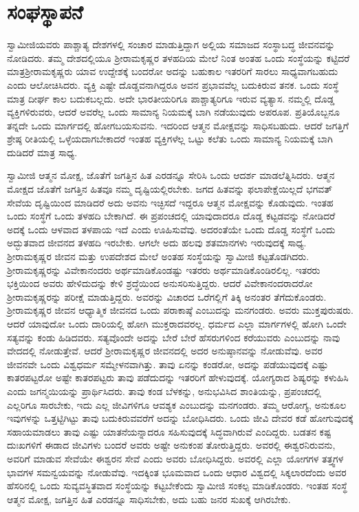 
\chapter{ಸಂಘಸ್ಥಾಪನೆ}

 ಸ್ವಾಮೀಜಿಯವರು ಪಾಶ್ಚಾತ್ಯ ದೇಶಗಳಲ್ಲಿ ಸಂಚಾರ ಮಾಡುತ್ತಿದ್ದಾಗ ಅಲ್ಲಿಯ ಸಮಾಜದ ಸಂಸ್ಥಾಬದ್ಧ ಜೀವನವನ್ನು ನೋಡಿದರು. ತಮ್ಮ ದೇಶದಲ್ಲಿಯೂ ಶ‍್ರೀರಾಮಕೃಷ್ಣರ ತಳಹದಿಯ ಮೇಲೆ ನಿಂತ ಅಂತಹ ಒಂದು ಸಂಸ್ಥೆಯನ್ನು ಕಟ್ಟಿದರೆ ಮಾತ್ರ\break ಶ‍್ರೀರಾಮಕೃಷ್ಣರು ಯಾವ ಉದ್ದೇಶಕ್ಕೆ ಬಂದರೋ ಅದನ್ನು ಬಹುಕಾಲ ಇತರರಿಗೆ ಸಾರಲು ಸಾಧ್ಯವಾಗಬಹುದು ಎಂದು ಆಲೋಚಿಸಿದರು. ವ್ಯಕ್ತಿ ಎಷ್ಟೇ ದೊಡ್ಡವನಾಗಿದ್ದರೂ ಅವನ ಪ್ರಭಾವವೆಲ್ಲ ಬದುಕಿರುವ ತನಕ. ಒಂದು ಸಂಸ್ಥೆ ಮಾತ್ರ ದೀರ್ಘ ಕಾಲ ಬದುಕಬಲ್ಲದು. ಅದೇ ಭಾರತೀಯರಿಗೂ‌ ಪಾಶ್ಚಾತ್ಯರಿಗೂ ಇರುವ ವ್ಯತ್ಯಾಸ. ನಮ್ಮಲ್ಲಿ ದೊಡ್ಡ ವ್ಯಕ್ತಿಗಳಿರುವರು, ಆದರೆ ಅವರೆಲ್ಲ ಒಂದು ಸಾಮಾನ್ಯ ನಿಯಮಕ್ಕೆ ಬಾಗಿ ನಡೆಯುವುದು ಅಪರೂಪ. ಪ್ರತಿಯೊಬ್ಬನೂ ತನ್ನದೇ ಒಂದು ಮಾರ್ಗದಲ್ಲಿ ಹೋಗಬಯಸುವನು. ಇದರಿಂದ ಆತ್ಮನ ಮೋಕ್ಷವನ್ನು ಸಾಧಿಸಬಹುದು. ಆದರೆ ಜಗತ್ತಿಗೆ ಶ್ರೇಷ್ಠ ರೀತಿಯಲ್ಲಿ ಒಳ್ಳೆಯದಾಗಬೇಕಾದರೆ ಇಂತಹ ವ್ಯಕ್ತಿಗಳೆಲ್ಲ ಒಟ್ಟು ಕಲೆತು ಒಂದು ಸಾಮಾನ್ಯ ನಿಯಮಕ್ಕೆ ಬಾಗಿ ದುಡಿದರೆ ಮಾತ್ರ ಸಾಧ್ಯ. 

 ಸ್ವಾಮೀಜಿ ಆತ್ಮನ ಮೋಕ್ಷ, ಜೊತೆಗೆ ಜಗತ್ತಿನ ಹಿತ ಎರಡನ್ನೂ ಸೇರಿಸಿ ಒಂದು ಆದರ್ಶ ಮಾಡಲೆತ್ನಿಸಿದರು. ಆತ್ಮನ ಮೋಕ್ಷದ ಜೊತೆಗೆ ಜಗತ್ತಿನ ಹಿತವೂ ನಮ್ಮ ದೃಷ್ಟಿಯಲ್ಲಿರಬೇಕು. ಜಗದ ಹಿತವನ್ನು ಫಲಾಪೇಕ್ಷೆಯಿಲ್ಲದೆ ಭಗವತ್ ಸೇವೆಯ ದೃಷ್ಟಿಯಿಂದ ಮಾಡಿದರೆ ಅದು ಅವನು ಇಚ್ಛಿಸದೆ ಇದ್ದರೂ ಆತ್ಮನ ಮೋಕ್ಷವನ್ನು ಕೊಡುವುದು. ಇಂತಹ ಒಂದು ಸಂಸ್ಥೆಗೆ ಒಂದು ತಳಹದಿ ಬೇಕಾಗಿದೆ. ಈ ಪ್ರಪಂಚದಲ್ಲಿ ಯಾವುದಾದರೂ ದೊಡ್ಡ ಕಟ್ಟಡವನ್ನು ನೋಡಿದರೆ ಅದಕ್ಕೆ ಒಂದು ಆಳವಾದ ತಳಪಾಯ ಇದೆ ಎಂದು ಊಹಿಸುವೆವು. ಅದರಂತೆಯೇ ಒಂದು ದೊಡ್ಡ ಸಂಸ್ಥೆಗೆ ಒಂದು ಅದ್ಭುತವಾದ ಜೀವನದ ತಳಹದಿ ಇರಬೇಕು. ಆಗಲೇ ಅದು ಹಲವು ಶತಮಾನಗಳು ಇರುವುದಕ್ಕೆ ಸಾಧ್ಯ. ಶ‍್ರೀರಾಮಕೃಷ್ಣರ ಜೀವನ ಮತ್ತು ಉಪದೇಶದ ಮೇಲೆ ಅಂತಹ ಸಂಸ್ಥೆಯನ್ನು ಸ್ವಾಮೀಜಿ ಕಟ್ಟತೊಡಗಿದರು. ಶ‍್ರೀರಾಮಕೃಷ್ಣರನ್ನು ವಿವೇಕಾನಂದರು ಅರ್ಥಮಾಡಿಕೊಂಡಷ್ಟು ಇತರರು ಅರ್ಥಮಾಡಿಕೊಂಡಿರಲಿಲ್ಲ. ಇತರರು ಭಕ್ತಿಯಿಂದ ಅವರು ಹೇಳಿದುದನ್ನು ಕೇಳಿ ಶ್ರದ್ಧೆಯಿಂದ ಅನುಸರಿಸುತ್ತಿದ್ದರು. ಆದರೆ ವಿವೇಕಾನಂದರಾದರೋ ಶ‍್ರೀರಾಮಕೃಷ್ಣರನ್ನು ಪರೀಕ್ಷೆ ಮಾಡುತ್ತಿದ್ದರು. ಅವರನ್ನು ವಿಚಾರದ ಒರೆಗಲ್ಲಿಗೆ ತಿಕ್ಕಿ ಅನಂತರ ತೆಗೆದುಕೊಂಡರು. ಶ‍್ರೀರಾಮಕೃಷ್ಣರ ಜೀವನ ಆಧ್ಯಾತ್ಮಿಕ ಜೀವನದ ಒಂದು ಪರಾಕಾಷ್ಠೆ ಎಂಬುದನ್ನು ಮನಗಂಡರು. ಅವರು ಮುಕ್ತಪುರುಷರು. ಆದರೆ ಯಾವುದೋ ಒಂದು ದಾರಿಯಲ್ಲಿ ಹೋಗಿ ಮುಕ್ತರಾದವರಲ್ಲ. ಧರ್ಮದ ಎಲ್ಲಾ ಮಾರ್ಗಗಳಲ್ಲಿ ಹೋಗಿ ಒಂದೇ ಸತ್ಯವನ್ನು ಕಂಡು ಹಿಡಿದವರು. ಸತ್ಯವೊಂದೇ ಅದನ್ನು ಬೇರೆ ಬೇರೆ ಹೆಸರುಗಳಿಂದ ಕರೆಯುವರು ಎಂಬುದನ್ನು ನಾವು ವೇದದಲ್ಲಿ ನೋಡುತ್ತೇವೆ. ಆದರೆ ಶ‍್ರೀರಾಮಕೃಷ್ಣರ ಜೀವನದಲ್ಲಿ ಅದರ ಅನುಷ್ಠಾನವನ್ನು ನೋಡುವೆವು. ಅವರ ಜೀವನವೇ ಒಂದು ವಿಶ್ವಧರ್ಮ ಸಮ್ಮೇಳನವಾಗಿತ್ತು. ತಾವು ಏನನ್ನು ಕಂಡರೋ, ಅದನ್ನು ಪಡೆಯುವುದಕ್ಕೆ ಎಷ್ಟು ಕಾತರಪಟ್ಟರೋ ಅಷ್ಟೇ ಕಾತರಪಟ್ಟರು ತಾವು ಪಡೆದುದನ್ನು ಇತರರಿಗೆ ಹೇಳುವುದಕ್ಕೆ. ಯೋಗ್ಯರಾದ ಶಿಷ್ಯರನ್ನು ಕಳುಹಿಸಿ ಎಂದು ಜಗನ್ಮಯಿಯನ್ನು ಪ್ರಾರ್ಥಿಸಿದರು. ತಾವು ಕಂಡ ಬೆಳಕನ್ನು, ಅನುಭವಿಸಿದ ಶಾಂತಿಯನ್ನು, ಪ್ರಪಂಚದಲ್ಲಿ ಎಲ್ಲರಿಗೂ ಸಾರಬೇಕು, ಇದು ಎಲ್ಲ ಜೀವಿಗಳಿಗೂ ಆವಶ್ಯಕ ಎಂಬುದನ್ನು ಮನಗಂಡರು. ತಮ್ಮ ಆರೋಗ್ಯ, ಅನುಕೂಲ ಇವುಗಳನ್ನು ಒತ್ತಟ್ಟಿಗಿಟ್ಟು ತಾವು ಬದುಕಿರುವವರೆಗೆ ಅದನ್ನು ಬೋಧಿಸಿದರು. ಒಂದು ಜೀವಿ ದೇವರ ಕಡೆ ಹೋಗುವುದಕ್ಕೆ ಸಹಾಯಮಾಡಲು ತಾವು ಎಷ್ಟು ಯಾತನೆಯನ್ನಾದರೂ ಸಹಿಸುವುದಕ್ಕೆ ಸಿದ್ಧವಾಗಿರುವೆ ಎಂದಿದ್ದರು. ಬಡತನ ಕಷ್ಟ ದುಃಖಗಳಿಗೆ ಈಡಾದ ಜೀವಿಗಳು ಬಂದರೆ ಅವರು ಅಷ್ಟೇ ಅನುಕಂಪ ತೋರುತ್ತಿದ್ದರು. ಅವರಲ್ಲಿ ಈಶ್ವರನಿರುವನು, ಅವರಿಗೆ ಮಾಡುವ ಸೇವೆಯೇ ಈಶ್ವರನ ಸೇವೆ ಎಂದು ಅವರು ಬೋಧಿಸಿದ್ದರು. ಅವರಲ್ಲಿ ಎಲ್ಲಾ ಯೋಗಗಳ ತತ್ತ್ವಗಳ ಭಾವಗಳ ಸಮನ್ವಯವನ್ನು ನೋಡುವೆವು. ಇದಕ್ಕಿಂತ ಭೂಮವಾದ ಒಂದು ಆಧಾರ ವಿಶ್ವದಲ್ಲಿ ಸಿಕ್ಕಲಾರದೆಂದು ಅವರ ಹೆಸರಿನಲ್ಲಿ ಒಂದು ಸುವ್ಯವಸ್ಥಿತವಾದ ಸಂಸ್ಥೆಯನ್ನು ಕಟ್ಟಬೇಕೆಂದು ಸ್ವಾಮೀಜಿ ಸಂಕಲ್ಪ ಮಾಡಿಕೊಂಡರು. ಇಂತಹ ಸಂಸ್ಥೆ ಆತ್ಮನ ಮೋಕ್ಷ, ಜಗತ್ತಿನ ಹಿತ ಎರಡನ್ನೂ ಸಾಧಿಸಬೇಕು, ಅದು ಬಹು ಜನರ ಸುಖಕ್ಕೆ ಆಗಿರಬೇಕು. 

